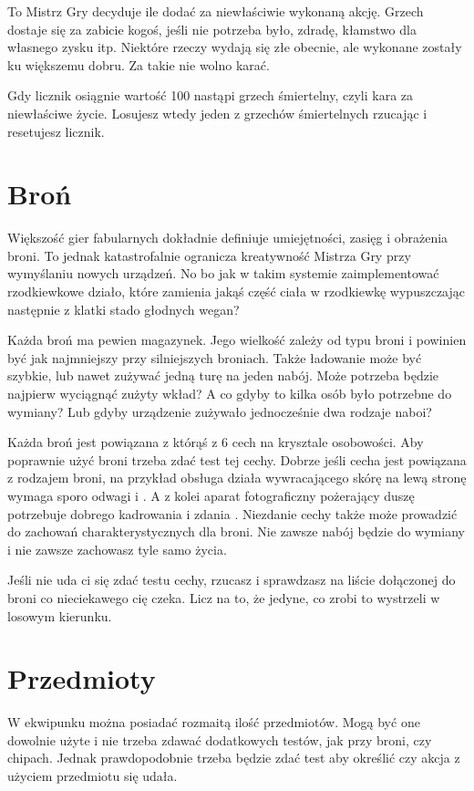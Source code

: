 To Mistrz Gry decyduje ile \abgrz{} dodać za niewłaściwie wykonaną akcję.
Grzech dostaje się za zabicie kogoś, jeśli nie potrzeba było, zdradę, kłamstwo dla własnego zysku itp.
Niektóre rzeczy wydają się złe obecnie, ale wykonane zostały ku większemu dobru. Za takie nie wolno karać.

Gdy licznik \abgrz{} osiągnie wartość 100 nastąpi grzech śmiertelny, czyli kara za niewłaściwe życie.
Losujesz wtedy jeden z grzechów śmiertelnych rzucając \dxx{} i resetujesz licznik.

\section{Broń}
Większość gier fabularnych dokładnie definiuje umiejętności, zasięg i obrażenia broni.
To jednak katastrofalnie ogranicza kreatywność Mistrza Gry przy wymyślaniu nowych urządzeń.
No bo jak w takim systemie zaimplementować rzodkiewkowe działo, które zamienia jakąś część ciała w rzodkiewkę wypuszczając następnie z klatki stado głodnych wegan?

Każda broń ma pewien magazynek.
Jego wielkość zależy od typu broni i powinien być jak najmniejszy przy silniejszych broniach.
Także ładowanie może być szybkie, lub nawet zużywać jedną turę na jeden nabój.
Może potrzeba będzie najpierw wyciągnąć zużyty wkład?
A co gdyby to kilka osób było potrzebne do wymiany?
Lub gdyby urządzenie zużywało jednocześnie dwa rodzaje naboi?

Każda broń jest powiązana z którąś z 6 cech na krysztale osobowości.
Aby poprawnie użyć broni trzeba zdać test tej cechy.
Dobrze jeśli cecha jest powiązana z rodzajem broni, na przykład obsługa działa wywracającego skórę na lewą stronę wymaga sporo odwagi i \abh{}.
A z kolei aparat fotograficzny pożerający duszę potrzebuje dobrego kadrowania i zdania \abp{}.
Niezdanie cechy także może prowadzić do zachowań charakterystycznych dla broni.
Nie zawsze nabój będzie do wymiany i nie zawsze zachowasz tyle samo życia.

Jeśli nie uda ci się zdać testu cechy, rzucasz \dx{} i sprawdzasz na liście dołączonej do broni co nieciekawego cię czeka.
Licz na to, że jedyne, co zrobi to wystrzeli w losowym kierunku.

\section{Przedmioty}
W ekwipunku można posiadać rozmaitą ilość przedmiotów.
Mogą być one dowolnie użyte i nie trzeba zdawać dodatkowych testów, jak przy broni, czy chipach.
Jednak prawdopodobnie trzeba będzie zdać test aby określić czy akcja z użyciem przedmiotu się udała.

